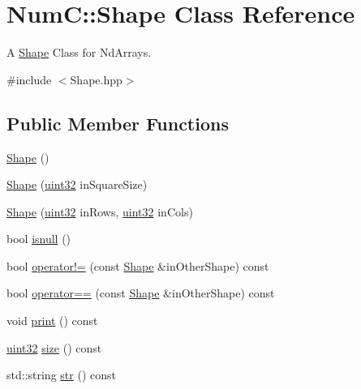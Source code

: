 \hypertarget{class_num_c_1_1_shape}{}\section{NumC\+:\+:Shape Class Reference}
\label{class_num_c_1_1_shape}


A \mbox{\hyperlink{class_num_c_1_1_shape}{Shape}} Class for Nd\+Arrays.  




{\ttfamily \#include $<$Shape.\+hpp$>$}

\subsection*{Public Member Functions}
\begin{DoxyCompactItemize}
\item 
\mbox{\hyperlink{class_num_c_1_1_shape_a33079d7437111c508cafe411e3fd033c}{Shape}} ()
\item 
\mbox{\hyperlink{class_num_c_1_1_shape_a2376c8ccff2c2594ce9afe7d9ca5d42d}{Shape}} (\mbox{\hyperlink{namespace_num_c_ae685802ca6d3035f2b400b081e3953fa}{uint32}} in\+Square\+Size)
\item 
\mbox{\hyperlink{class_num_c_1_1_shape_aa669d346c90edad6d7ce6f2b9a481eda}{Shape}} (\mbox{\hyperlink{namespace_num_c_ae685802ca6d3035f2b400b081e3953fa}{uint32}} in\+Rows, \mbox{\hyperlink{namespace_num_c_ae685802ca6d3035f2b400b081e3953fa}{uint32}} in\+Cols)
\item 
bool \mbox{\hyperlink{class_num_c_1_1_shape_a180150d51d6ddfbd1db5279489c6866d}{isnull}} ()
\item 
bool \mbox{\hyperlink{class_num_c_1_1_shape_a9067ce9c89bc0859fc17b27ad588bfdf}{operator!=}} (const \mbox{\hyperlink{class_num_c_1_1_shape}{Shape}} \&in\+Other\+Shape) const
\item 
bool \mbox{\hyperlink{class_num_c_1_1_shape_a34bc152092e6040854c38b318cb33771}{operator==}} (const \mbox{\hyperlink{class_num_c_1_1_shape}{Shape}} \&in\+Other\+Shape) const
\item 
void \mbox{\hyperlink{class_num_c_1_1_shape_a4a1fe464c014b1af25c24a5de9621761}{print}} () const
\item 
\mbox{\hyperlink{namespace_num_c_ae685802ca6d3035f2b400b081e3953fa}{uint32}} \mbox{\hyperlink{class_num_c_1_1_shape_aa143f614d1c367b7ecbf57e287ab08dd}{size}} () const
\item 
std\+::string \mbox{\hyperlink{class_num_c_1_1_shape_ae3e28b5a109ab81255adb2f1f7f88dbf}{str}} () const
\end{DoxyCompactItemize}
